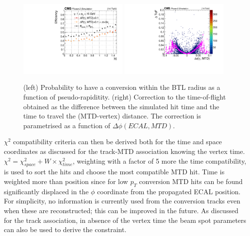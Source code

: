 \begin{figure}[!hbtp]
\centering
\includegraphics[width=0.48\textwidth]{fig/performance/neutrals/neutrals_efficiency_vs_eta.pdf}
\includegraphics[width=0.48\textwidth]{fig/performance/neutrals/delta_tof_vs_dPhi.pdf}
\caption{(left) Probability to have a conversion within the BTL radius as a function of pseudo-rapiditity. (right) Correction to the time-of-flight obtained as the difference between the simulated hit time and the time to travel the (MTD-vertex) distance. The correction is parametrised as a function of $\Delta\phi(ECAL,MTD)$.}
\label{fig:neutrals_mustache}
\end{figure}

$\chi^{2}$ compatibility criteria can then be derived both for the time and space coordinates as discussed for the track-MTD association knowing the vertex time.  $\chi^2=\chi^2_{space}+W\times\chi^2_{time}$, weighting with a factor of 5 more the time compatibility, is used to sort the hits and choose the most compatible MTD hit. Time is weighted more than position since for low $p_{T}$ conversion MTD hits can be found significantly displaced in the $\phi$ coordinate from the propagated ECAL position. For simplicity, no information is currently used from the conversion tracks even when these are reconstructed; this can be improved in the future. As discussed for the track association, in absence of the vertex time the beam spot parameters can also be used to derive the constraint.


